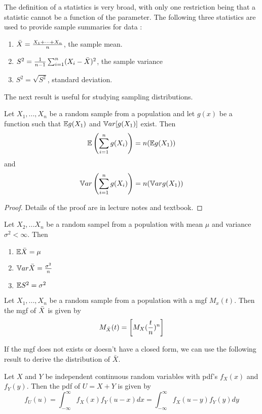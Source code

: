 The definition of a statistics is very broad, with only one restriction being that a statistic cannot be a function of the parameter. The following three statistics are used to provide sample summaries for data :
\begin{enumerate}
    \item $\Bar{X} = \frac{X_1+ \cdots +X_n}{n}$, the sample mean.
    \item $S^2 = \frac{1}{n-1} \sum_{i=1}^{n}(X_i- \Bar{X})^2$, the sample variance
    \item $S^2 = \sqrt{S^2}$, standard deviation.
\end{enumerate}
The next result is useful for studying sampling distributions.
\begin{lemma}
    Let $X_1,...,X_n$ be a random sample from a population and let $g(x)$ be a function such that $\mathbb E g(X_1)$ and $\mathbb V ar [g(X_1)]$ exist. Then
    $$
    \mathbb E \left(
    \sum_{i=1}^{n} g(X_i)
    \right)
    = n(\mathbb E g(X_1))
    $$
    and
    $$
    \mathbb V ar \left(
    \sum_{i=1}^{n} g(X_i)
    \right)
    = n(\mathbb V ar g(X_1))
    $$
\end{lemma}
\begin{proof}
Details of the proof are in lecture notes and textbook.
\end{proof}
Let $X_2,...X_n$ be a random sampel from a population with mean $\mu$ and variance $\sigma^2 < \infty$. Then
\begin{enumerate}
    \item $\mathbb E \Bar{X} = \mu$
    \item $\mathbb V ar \Bar{X} = \frac{\sigma^2}{n}$
    \item $\mathbb E S^2 = \sigma^2$
\end{enumerate}

\begin{theorem}
Let $X_1,...,X_n$ be a random sample from a population with a mgf $M_x(t)$. Then the mgf of $\Bar{X}$ is given by
$$
M_{\Bar{X}}(t) = \left[
M_{X}(\frac{t}{n})^n
\right]
$$
\end{theorem}
If the mgf does not exists or doesn't have a closed form, we can use the following result to derive the distribution of $\bar{X}$.

\begin{theorem}
    Let $X$ and $Y$ be independent continuous random variables with pdf's
    $f_X(x)$ and $f_Y(y)$. Then the pdf of $U = X+Y$ is given by
    $$
    f_U(u) = \int_{-\infty}^{\infty} f_{X}(x)f_{Y}(u-x)dx = 
    \int_{-\infty}^{\infty} f_{X}(u-y)f_{Y}(y)dy
    $$
\end{theorem}